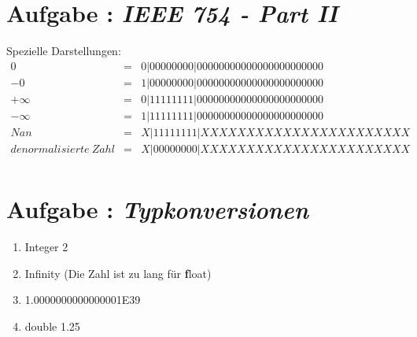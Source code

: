 	\section*{Aufgabe : \textnormal{\textit{IEEE 754 - Part II}}}
	Spezielle Darstellungen:\\
		\[
		\begin{array}{rcl}
		0 &=& 0|00000000|00000000000000000000000\\
		-0 &=& 1|00000000|00000000000000000000000\\
		+\infty &=& 0|11111111|00000000000000000000000\\
		-\infty &=& 1|11111111|00000000000000000000000\\
		Nan &=& X|11111111|XXXXXXXXXXXXXXXXXXXXXXX\\
		denormalisierte\ Zahl &=& X|00000000|XXXXXXXXXXXXXXXXXXXXXXX\\
		\end{array}
		\]
	
	\section*{Aufgabe : \textnormal{\textit{Typkonversionen}}}
		\begin{enumerate}[label=(\alph*)]
			\item Integer 2 
			\item Infinity (Die Zahl ist zu lang für \textbf float)
			\item 1.0000000000000001E39
			\item double 1.25
		\end{enumerate}
	


